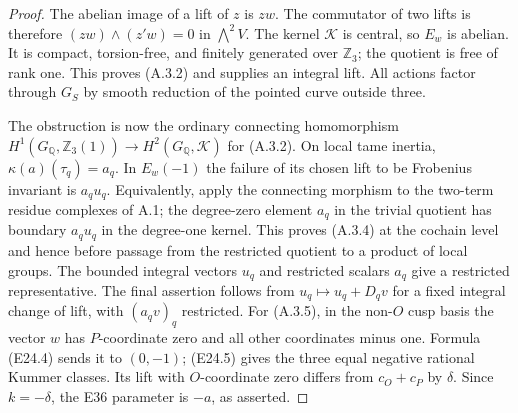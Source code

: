 \begin{proof}
The abelian image of a lift of $z$ is $zw$. The commutator of two
lifts is therefore $(zw)\wedge(z'w)=0$ in $\bigwedge^2V$.
The kernel $\mathcal K$ is central, so $E_w$ is abelian. It is
compact, torsion-free, and finitely generated over $\mathbb Z_3$;
the quotient is free of rank one. This proves (A.3.2) and supplies
an integral lift. All actions factor through $G_S$ by smooth
reduction of the pointed curve outside three.

The obstruction is now the ordinary connecting homomorphism
$H^1(G_{\mathbb Q},\mathbb Z_3(1))\to
H^2(G_{\mathbb Q},\mathcal K)$ for (A.3.2). On local tame inertia,
$\kappa(a)(\tau_q)=a_q$. In $E_w(-1)$ the failure of its chosen
lift to be Frobenius invariant is $a_qu_q$. Equivalently, apply the
connecting morphism to the two-term residue complexes of A.1;
the degree-zero element $a_q$ in the trivial quotient has boundary
$a_qu_q$ in the degree-one kernel. This proves (A.3.4) at the
cochain level and hence before passage from the restricted quotient
to a product of local groups. The bounded integral vectors $u_q$
and restricted scalars $a_q$ give a restricted representative.
The final assertion follows from $u_q\mapsto u_q+D_qv$ for a
fixed integral change of lift, with $(a_qv)_q$ restricted.
For (A.3.5), in the non-$O$ cusp basis the vector $w$ has
$P$-coordinate zero and all other coordinates minus one. Formula
(E24.4) sends it to $(0,-1)$; (E24.5) gives the three equal negative
rational Kummer classes. Its lift with $O$-coordinate zero differs
from $c_O+c_P$ by $\delta$. Since $k=-\delta$, the E36 parameter
is $-a$, as asserted.
\end{proof}


